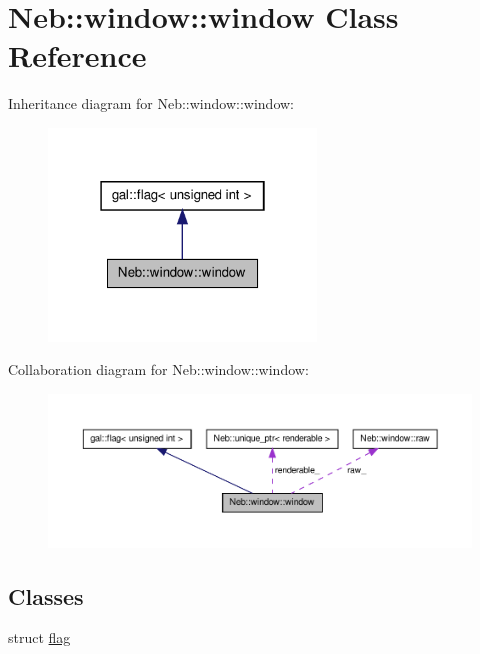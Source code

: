 \hypertarget{classNeb_1_1window_1_1window}{\section{\-Neb\-:\-:window\-:\-:window \-Class \-Reference}
\label{classNeb_1_1window_1_1window}
}


\-Inheritance diagram for \-Neb\-:\-:window\-:\-:window\-:\nopagebreak
\begin{figure}[H]
\begin{center}
\leavevmode
\includegraphics[width=202pt]{classNeb_1_1window_1_1window__inherit__graph}
\end{center}
\end{figure}


\-Collaboration diagram for \-Neb\-:\-:window\-:\-:window\-:\nopagebreak
\begin{figure}[H]
\begin{center}
\leavevmode
\includegraphics[width=350pt]{classNeb_1_1window_1_1window__coll__graph}
\end{center}
\end{figure}
\subsection*{\-Classes}
\begin{DoxyCompactItemize}
\item 
struct \hyperlink{structNeb_1_1window_1_1window_1_1flag}{flag}
\end{DoxyCompactItemize}
